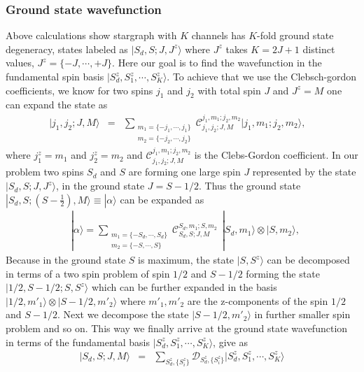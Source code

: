 \documentclass[reprint,prb,superscriptaddress]{revtex4-1}
\begin{document}
\subsubsection{Ground state wavefunction}
\noindent Above calculations show stargraph with $K$ channels has $K$-fold ground state degeneracy, states labeled as $|S_d,S;J,J^z\rangle$ where $J^z$ takes $K=2J+1$ distinct values, $J^z=\{-J,\cdots,+J \}$. Here our goal is to find the wavefunction in the fundamental spin basis $|S_d^z,S_1^z,\cdots,S_K^z\rangle$. To achieve that we use the Clebsch-gordon coefficients, we know for two spins $j_1$ and $j_2$  with total spin $J$ and $J^z=M$ one can expand the state as 
\begin{eqnarray}
|j_1,j_2;J,M\rangle &=& \displaystyle\sum_{\substack{m_1=\{-j_1,\cdots,j_1\} \\ m_2=\{-j_2,\cdots,j_2\} }}   \mathcal{C}^{j_1,m_1;j_2,m_2}_{j_1,j_2;J,M} |j_1,m_1;j_2,m_2 \rangle ,~~~~
\end{eqnarray}
where $j_1^z=m_1$ and $j_2^z=m_2$ and $\mathcal{C}^{j_1,m_1;j_2,m_2}_{j_1,j_2;J,M}$ is the Clebs-Gordon coefficient. In our problem two spins $S_d$ and $S$ are forming one large spin $J$ represented by the state $|S_d,S;J,J^z\rangle$, in the ground state $J=S-1/2$. Thus the ground state $|S_d,S; (S-\frac{1}{2} ),M\rangle \equiv |\alpha\rangle$ can be expanded as
\begin{eqnarray}
&&|\alpha\rangle= \displaystyle\sum_{\substack{m_1=\{-S_d,\cdots,S_d\} \\ m_2=\{-S,\cdots,S\} }} \mathcal{C}^{S_d,m_1;S,m_2}_{S_d,S;J,M} ~~   | S_d,m_1 \rangle \otimes  |S,m_2  \rangle ,~~~~
\end{eqnarray}
Because in the ground state $S$ is maximum, the state $|S,S^z\rangle$ can be decomposed in terms of a two spin problem of spin $1/2$ and $S-1/2$ forming the state $|1/2,S-1/2;S,S^z\rangle$ which can be further expanded in the basis $ |1/2,m'_1 \rangle \otimes  |S-1/2,m'_2  \rangle $ where $m'_1,m'_2$ are the z-components of the spin $1/2$ and $S-1/2$. Next we decompose the state $|S-1/2,m'_2\rangle$ in further smaller spin problem and so on. This way we finally arrive at the ground state wavefunction in terms of the fundamental basis $|S_d^z,S_1^z,\cdots,S_K^z\rangle$, give as
\begin{eqnarray}
|S_d,S;J,M\rangle &=& \sum_{S_d^z,\{S_i^z\}} \mathcal{D}_{S_d^z,\{S_i^z\}} |S_d^z,S_1^z,\cdots,S_K^z\rangle
\end{eqnarray}
\end{document}
